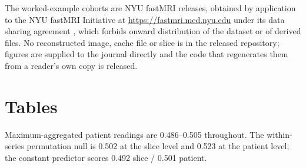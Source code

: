 \documentclass[11pt,a4paper]{article}
\begin{document}
The worked-example cohorts are NYU fastMRI releases, obtained by application to the
NYU fastMRI Initiative at \url{https://fastmri.med.nyu.edu} under its data sharing
agreement \citep{knoll2020fastmri,zbontar2018fastmri,tibrewala2023fastmriprostate,solomon2025fastmribreast},
which forbids onward distribution of the dataset or of derived files. No
reconstructed image, cache file or slice is in the released repository; figures are
supplied to the journal directly and the code that regenerates them from a reader's
own copy is released.

\clearpage
\section*{Tables}

\begin{table}[htbp]
\centering
\caption{RSNA 2019 Intracranial Haemorrhage: one pixel-blind score vector read at
two units, all six official labels. \num{752802} slices, \num{21744} series,
\num{18938} patients. Intervals are 95\% percentile intervals from 2,000
bootstrap replicates resampling patients. Nothing changes between the slice and
patient columns except the unit at which the ranking is performed.}
\label{tab:ich}
\small
{}

\vspace{0.3em}
\footnotesize
Maximum-aggregated patient readings are 0.486--0.505 throughout. The within-series
permutation null is 0.502 at the slice level and 0.523 at the patient level; the
constant predictor scores 0.492 slice / 0.501 patient.
\end{table}
\end{document}
